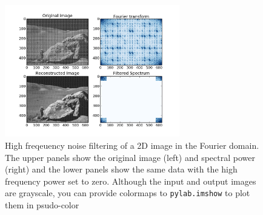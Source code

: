 \begin{figure}
\begin{centering}\includegraphics[width=3in]{fig/fft_imdenoise}\par\end{centering}

\caption{\label{fig:fft_imdenoise}High freqeuency noise filtering of a 2D image in the Fourier domain.  The upper panels show the original image (left) and spectral power (right) and the lower panels show the same data with the high frequency power set to zero.  Although the input and output images are grayscale, you can provide colormaps to \texttt{pylab.imshow} to plot them in psudo-color}
\end{figure}
